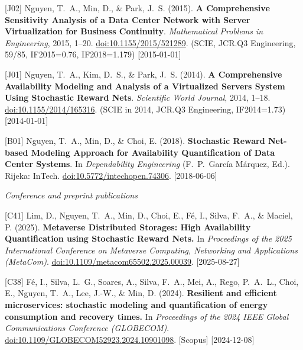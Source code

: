 {\begin{pubenumerate}
\item {\color{blue}[J02]} Nguyen, T.\ A., Min, D., \& Park, J.\ S. (2015). \textbf{A Comprehensive Sensitivity Analysis of a Data Center Network with Server Virtualization for Business Continuity}. \textit{Mathematical Problems in Engineering}, 2015, 1--20. \href{http://dx.doi.org/10.1155/2015/521289}{doi:10.1155/2015/521289}. (SCIE, JCR.Q3 Engineering, 59/85, IF2015=0.76, IF2018=1.179) [2015-01-01]

\item {\color{blue}[J01]} Nguyen, T.\ A., Kim, D.\ S., \& Park, J.\ S. (2014). \textbf{A Comprehensive Availability Modeling and Analysis of a Virtualized Servers System Using Stochastic Reward Nets}. \textit{Scientific World Journal}, 2014, 1--18. \href{http://dx.doi.org/10.1155/2014/165316}{doi:10.1155/2014/165316}. (SCIE in 2014, JCR.Q3 Engineering, IF2014=1.73) [2014-01-01]

\item {\color{yellow}[B01]} Nguyen, T.\ A., Min, D., \& Choi, E. (2018). \textbf{Stochastic Reward Net-based Modeling Approach for Availability Quantification of Data Center Systems}. In \textit{Dependability Engineering} (F.\ P.\ Garc\'ia M\'arquez, Ed.). Rijeka: InTech. \href{https://doi.org/10.5772/intechopen.74306}{doi:10.5772/intechopen.74306}. [2018-06-06]

\end{pubenumerate}

\textit{Conference and preprint publications}
\begin{pubenumerate}
\item {\color{green}[C41]} Lim, D., Nguyen, T.\ A., Min, D., Choi, E., F\'e, I., Silva, F.\ A., \& Maciel, P. (2025). 
  \textbf{Metaverse Distributed Storages: High Availability Quantification using Stochastic Reward Nets.} 
  In \textit{Proceedings of the 2025 International Conference on Metaverse Computing, Networking and Applications (MetaCom)}. 
  \href{https://doi.org/10.1109/metacom65502.2025.00039}{doi:10.1109/metacom65502.2025.00039}. [2025-08-27]

\item {\color{green}[C38]} F\'e, I., Silva, L.\ G., Soares, A., Silva, F.\ A., Mei, A., Rego, P.\ A.\ L., Choi, E., Nguyen, T.\ A., Lee, J.-W., \& Min, D. (2024). 
  \textbf{Resilient and efficient microservices: stochastic modeling and quantification of energy consumption and recovery times.} 
  In \textit{Proceedings of the 2024 IEEE Global Communications Conference (GLOBECOM)}. 
  \href{https://doi.org/10.1109/GLOBECOM52923.2024.10901098}{doi:10.1109/GLOBECOM52923.2024.10901098}. [Scopus] [2024-12-08]


\end{pubenumerate}}
